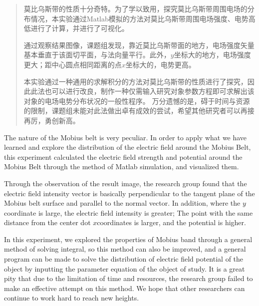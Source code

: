 

\begin{abstract}
  莫比乌斯带的性质十分奇特。为了学以致用，探究莫比乌斯带周围电场的分布情况，本实验通过Matlab模拟的方法对莫比乌斯带周围电场强度、电势高低进行了计算，并进行了可视化。

  通过观察结果图像，课题组发现，靠近莫比乌斯带面的地方，电场强度矢量基本垂直于该面切平面，与法向量平行。此外，$y$坐标大的地方，电场强度更大；距中心圆点相同距离的点$x$坐标大的，电势更高。

  本实验通过一种通用的求解积分的方法对莫比乌斯带的性质进行了探究，因此此法也可以进行改良，制作一种仅需输入研究对象参数方程即可求解出该对象的电场电势分布状况的一般性程序。
  万分遗憾的是，碍于时间与资源的限制，课题组未能对此法做出卓有成效的尝试，希望其他研究者可以再接再厉，勇创新高。
\end{abstract}

\begin{abstract*}
  The nature of the Mobius belt is very peculiar. In order to apply what we have learned and explore the distribution of the electric field around the Mobius Belt, 
  this experiment calculated the electric field strength and potential around the Mobius Belt through the method of Matlab simulation, and visualized them. 
  
  Through the observation of the result image, 
  the research group found that the electric field intensity vector is basically perpendicular to the tangent plane of the Mobius belt surface and parallel to the normal vector. 
  In addition, where the $y $coordinate is large, the electric field intensity is greater; The point with the same distance from the center dot $x $coordinates is larger, and the potential is higher. 
  
  In this experiment, we explored the properties of Mobius band through a general method of solving integral, so this method can also be improved, 
  and a general program can be made to solve the distribution of electric field potential of the object by inputting the parameter equation of the object of study. 
  It is a great pity that due to the limitation of time and resources, the research group failed to make an effective attempt on this method. 
  We hope that other researchers can continue to work hard to reach new heights.
\end{abstract*}
